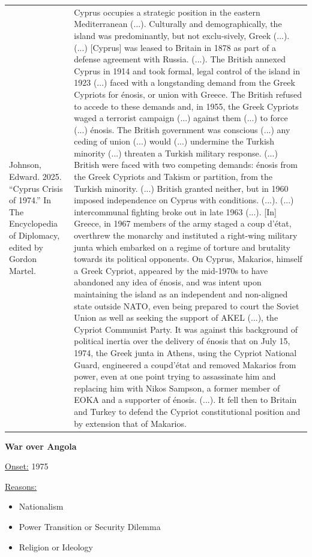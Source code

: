 {\begin{longtable}{p{}p{}}
\\
Johnson, Edward. 2025. “Cyprus Crisis of 1974.” In The Encyclopedia of Diplomacy, edited by Gordon Martel. & Cyprus occupies a strategic position in the eastern Mediterranean (...). Culturally and demographically, the island was predominantly, but not exclu-sively, Greek (...). (...) [Cyprus] was leased to Britain in 1878 as part of a defense agreement with Russia. (...). The British annexed Cyprus in 1914 and took formal, legal control of the island in 1923 (...) faced with a longstanding demand from the Greek Cypriots for énosis, or union with Greece. The British refused to accede to these demands and, in 1955, the Greek Cypriots waged a terrorist campaign (...) against them (...) to force (...) énosis. The British government was conscious (...) any ceding of union (...) would (...) undermine the Turkish minority (...) threaten a Turkish military response. (...) British were faced with two competing demands: énosis from the Greek Cypriots and Takism or partition, from the Turkish minority. (...) British granted neither, but in 1960 imposed independence on Cyprus with conditions. (...). (...) intercommunal fighting broke out in late 1963 (...). [In] Greece, in 1967 members of the army staged a coup d'état, overthrew the monarchy and instituted a right-wing military junta which embarked on a regime of torture and brutality towards its political opponents. On Cyprus, Makarios, himself a Greek Cypriot, appeared by the mid-1970s to have abandoned any idea of énosis, and was intent upon maintaining the island as an independent and non-aligned state outside NATO, even being prepared to court the Soviet Union as well as seeking the support of AKEL (...), the Cypriot Communist Party. It was against this background of political inertia over the delivery of énosis that on July 15, 1974, the Greek junta in Athens, using the Cypriot National Guard, engineered a coupd'état and removed Makarios from power, even at one point trying to assassinate him and replacing him with Nikos Sampson, a former member of EOKA and a supporter of énosis. (...). It fell then to Britain and Turkey to defend the Cypriot constitutional position and by extension that of Makarios.
\\
\end{longtable}}
\clearpage
         \textbf{War over Angola} 

          \underline{Onset:} 1975         

\underline{Reasons:}
\begin{itemize}
\item Nationalism
\item Power Transition or Security Dilemma
\item Religion or Ideology
\end{itemize}

